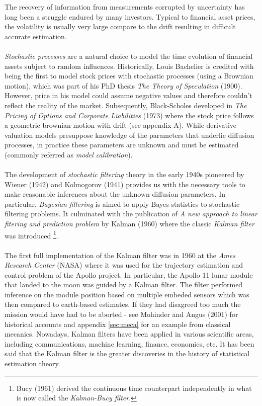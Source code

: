 \documentclass{article}
\theoremstyle{definition}
\theoremstyle{remark}
\begin{document}
The recovery of information from measurements corrupted by uncertainty has long been a struggle endured by many investors. Typical to financial asset prices, the volatility is usually very large compare to the drift resulting in difficult accurate estimation. \\
\\
\emph{Stochastic processes} are a natural choice to model the time evolution of financial assets subject to random influences. Historically, Louis Bachelier is credited with being the first to model stock prices with stochastic processes (using a Brownian motion), which was part of his PhD thesis \emph{The Theory of Speculation} (1900). However, price in his model could assume negative values and therefore couldn't reflect the reality of the market. Subsequently, Black-Scholes developed in \emph{The Pricing of Options and Corporate Liabilities} (1973) where the stock price follows a geometric brownian motion with drift (see appendix A). While derivative valuation models presuppose knowledge of the parameters that underlie diffusion processes, in practice these parameters are unknown and must be estimated (commonly referred as \emph{model calibration}).\\
\\%
The development of \emph{stochastic filtering} theory in the early 1940s pioneered by Wiener (1942) and Kolmogorov (1941) provides us with the necessary tools to make reasonable inferences about the unknown diffusion parameters. In particular, \emph{Bayesian filtering} is aimed to apply Bayes statistics to stochastic filtering problems. It culminated with the publication of \emph{A new approach to linear fitering and prediction problem} by Kalman (1960) where the classic \emph{Kalman filter} was introduced \footnote{Bucy (1961) derived the continuous time counterpart independently in what is now called the \emph{Kalman-Bucy filter}.}.\\
\\%
The first full implementation of the Kalman filter was in 1960 at the \emph{Ames Research Center} (NASA) where it was used for the trajectory estimation and control problem of the Apollo project. In particular, the Apollo 11 lunar module that landed to the moon was guided by a Kalman filter. The filter performed inference on the module position based on multiple embeded sensors which was then compared to earth-based estimates. If they had disagreed too much the mission would have had to be aborted - see Mohinder and Angus (2001) for historical accounts and appendix \ref{sec:meca} for an example from classical mecanics. Nowadays, Kalman filters have been applied in various scientific areas, including communications, machine learning, finance, economics, etc. It has been said that the Kalman filter is the greater discoveries in the history of statistical estimation theory.\\
\end{document}
